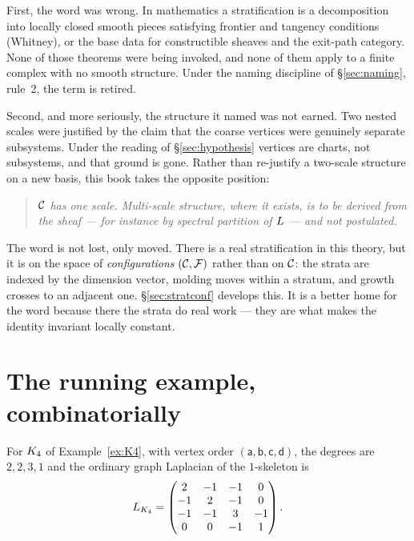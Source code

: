 First, the word was wrong. In mathematics a stratification is a decomposition
into locally closed smooth pieces satisfying frontier and tangency conditions
(Whitney), or the base data for constructible sheaves and the exit-path
category. None of those theorems were being invoked, and none of them apply to
a finite complex with no smooth structure. Under the naming discipline of
\S\ref{sec:naming}, rule~2, the term is retired.

Second, and more seriously, the structure it named was not earned. Two nested
scales were justified by the claim that the coarse vertices were genuinely
separate subsystems. Under the reading of \S\ref{sec:hypothesis} vertices are
charts, not subsystems, and that ground is gone. Rather than re-justify a
two-scale structure on a new basis, this book takes the opposite position:

\begin{quote}\itshape
$\mathcal{C}$ has one scale. Multi-scale structure, where it exists, is to be
\emph{derived} from the sheaf --- for instance by spectral partition of $L$
--- and not postulated.
\end{quote}

\begin{remark}\label{rem:stratmoved}
The word is not lost, only moved. There is a real stratification in this
theory, but it is on the space of \emph{configurations} $(\mathcal{C},\mathcal{F})$ rather
than on $\mathcal{C}$: the strata are indexed by the dimension vector, molding moves
within a stratum, and growth crosses to an adjacent one.
\S\ref{sec:stratconf} develops this. It is a better home for the word because
there the strata do real work --- they are what makes the identity invariant
locally constant.
\end{remark}

\section{The running example, combinatorially}\label{sec:running}

For $K_4$ of Example~\ref{ex:K4}, with vertex order
$(\mathsf a,\mathsf b,\mathsf c,\mathsf d)$, the degrees are
$2,2,3,1$ and the ordinary graph Laplacian of the $1$-skeleton is
\begin{equation}\label{eq:LK4}
  L_{K_4}=
  \begin{pmatrix}
     2 & -1 & -1 &  0\\
    -1 &  2 & -1 &  0\\
    -1 & -1 &  3 & -1\\
     0 &  0 & -1 &  1
  \end{pmatrix}.
\end{equation}

